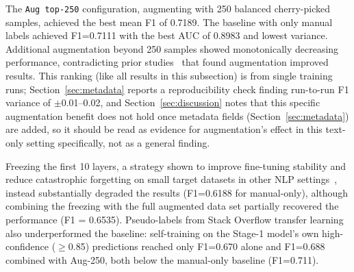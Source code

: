 \documentclass[preprint,12pt]{elsarticle}
\begin{document}
The \texttt{Aug top-250} configuration, augmenting with 250 balanced cherry-picked samples, achieved the best mean F1 of 0.7189. The baseline with only manual labels achieved F1=0.7111 with the best AUC of 0.8983 and lowest variance. Additional augmentation beyond 250 samples showed monotonically decreasing performance, contradicting prior studies~\cite{nam2013, uddin2022} that found augmentation improved results. This ranking (like all results in this subsection) is from single training runs; Section~\ref{sec:metadata} reports a reproducibility check finding run-to-run F1 variance of $\pm$0.01--0.02, and Section~\ref{sec:discussion} notes that this specific augmentation benefit does not hold once metadata fields (Section~\ref{sec:metadata}) are added, so it should be read as evidence for augmentation's effect in this text-only setting specifically, not as a general finding.

Freezing the first 10 layers, a strategy shown to improve fine-tuning stability and reduce catastrophic forgetting on small target datasets in other NLP settings~\cite{howard2018ulmfit}, instead substantially degraded the results (F1=0.6188 for manual-only), although combining the freezing with the full augmented data set partially recovered the performance (F1 = 0.6535). Pseudo-labels from Stack Overflow transfer learning also underperformed the baseline: self-training on the Stage-1 model's own high-confidence ($\geq$0.85) predictions reached only F1=0.670 alone and F1=0.688 combined with Aug-250, both below the manual-only baseline (F1=0.711).
\end{document}
